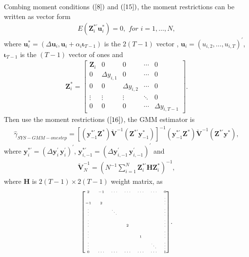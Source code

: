 \documentclass[12pt,a4paper,hyperref]{article}
\begin{document}
  Combing moment conditions $\left(\ref{8}\right)$ and $\left(\ref{15}\right)$, the moment restrictions can be written as vector form
  \begin{align}
  E\left( \boldsymbol{Z}_{i}^{\ast'} \boldsymbol{u}_{i}^{\ast} \right)=0, \,\,for\,\, i=1,\ldots, N, \label{16}
  \end{align}
 where $\boldsymbol{u}_{i}^{\ast} =(\Delta \boldsymbol{u}_{i}, \boldsymbol{u}_{i}+\alpha_{i} \boldsymbol{\iota}_{T-1})$ is the $2(T-1)$ vector , $\boldsymbol{u}_{i}=\left(u_{i,2},\ldots, u_{i,T}  \right)^{'}$, $\boldsymbol{\iota}_{T-1}$ is the $(T-1)$ vector of ones and
\begin{align}
\boldsymbol{Z}_{i}^{\ast}=
\begin{bmatrix}
\boldsymbol{Z}_{i} & 0&  0 &\cdots & 0\\
  0    & \Delta y_{i,1} & 0  & \cdots &  0      \\
  0   & 0  &  \Delta y_{i,2} &    \cdots &    0  \\
  \vdots  & \vdots  &\vdots &  \ddots &    0      \\
   0     & 0  & 0& \cdots     &  \Delta y_{i,T-1}
\end{bmatrix}.
\end{align}
Then use the moment restrictions $\left( \ref{16} \right)$, the GMM estimator is
\begin{align}
\hat{\gamma}_{SYS-GMM-onestep}=\left[ \left( \boldsymbol{y}_{-1}^{\ast '} \boldsymbol{Z}^{\ast} \right)\boldsymbol{\check{V}}^{-1}\left( \boldsymbol{Z}^{\ast'} \boldsymbol{y}^{\ast}_{-1}  \right) \right]^{-1}\left( \boldsymbol{y}_{-1}^{\ast'} \boldsymbol{Z}^{\ast} \right)\boldsymbol{\check{V}}^{-1}\left( \boldsymbol{Z}^{\ast '} \boldsymbol{y}^{\ast}  \right),
\end{align}
where $\boldsymbol{y}_{i}^{\ast'}=\left(\Delta \boldsymbol{y}_{i}^{'} \, \boldsymbol{y}_{i}^{'} \right)^{'}$,  $\boldsymbol{y}_{i,-1}^{\ast'}=\left(\Delta \boldsymbol{y}_{i,-1}^{'}\, \boldsymbol{y}_{i,-1}^{'} \right)^{'}$ and
\begin{align}
\boldsymbol{\check{V}}_{N}^{-1}=\left(N^{-1}\sum_{i=1}^{N} \boldsymbol{Z}_{i}^{\ast '} \boldsymbol{H}  \boldsymbol{Z}_{i}^{\ast} \right)^{-1} ,
\end{align}
 where $\boldsymbol{H}$ is $2(T-1)\times 2(T-1)$ weight matrix, as
\begin{align}
\tiny{
\begin{bmatrix} 
 2 & -1 &\cdots &\cdots& \cdots & \cdots& 0\\
 -1 & 2 & & & & & \vdots \\
\vdots & & \ddots & & & & \vdots \\
\vdots & & & 2 && & \vdots \\
\vdots & & &  &1 & &\vdots \\
\vdots & & &  & &\ddots &\vdots \\
 0 & \cdots & \cdots & \cdots& \cdots & \cdots & 1
\end{bmatrix}}.
\end{align} 
\end{document}
